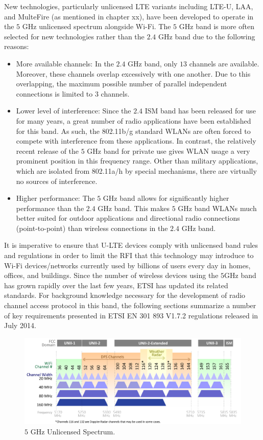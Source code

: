 New technologies, particularly unlicensed LTE variants including LTE-U, LAA, and MulteFire (as mentioned in chapter xx), have been developed to operate in the $5$ GHz unlicensed spectrum alongside Wi-Fi. The $5$ GHz band is more often selected for new technologies rather than the $2.4$ GHz band due to the following reasons:
\begin{itemize}
\item
More available channels: In the $2.4$ GHz band, only $13$ channels are available. Moreover, these channels overlap excessively with one another. Due to this overlapping, the maximum possible
number of parallel independent connections is limited to $3$ channels. 
\item
Lower level of interference: Since the $2.4$ ISM band has been released for use for many years, a great number of radio applications have been established for this band. As such, the 802.11b/g standard WLANs are often forced to compete with interference from these applications. In contrast, the relatively recent release of the $5$ GHz band for private use gives WLAN usage a very prominent position in this frequency range. Other than military applications, which are isolated from 802.11a/h by special mechanisms, there are virtually no sources of interference. 
\item
Higher performance: The $5$ GHz band allows for significantly higher performance than the $2.4$ GHz band. This makes $5$ GHz band WLANs much better suited for outdoor applications and directional radio connections (point-to-point) than wireless connections in the $2.4$ GHz band. 
\end{itemize}

It is imperative to ensure that U-LTE devices comply with unlicensed band rules and regulations in order to limit the RFI that this technology may introduce to Wi-Fi devices/networks currently used by billions of users every day in homes, offices, and buildings. Since the number of wireless devices using the $5$GHz band has grown rapidly over the last few years, ETSI has updated its related standards. For background knowledge necessary for the development of radio channel access protocol in this band, the following sections summarize a number of key requirements presented in ETSI EN 301 893 V1.7.2 regulations \cite{LBT-ETSI-2014} released in July 2014.

\begin{figure}[!t]
	\centering
	\includegraphics[width=1.0\columnwidth]{figures2/5GHz-spectrum.pdf}
	\caption{$5$ GHz Unlicensed Spectrum.}
	\label{figs:5GHz-spectrum}
\end{figure}


